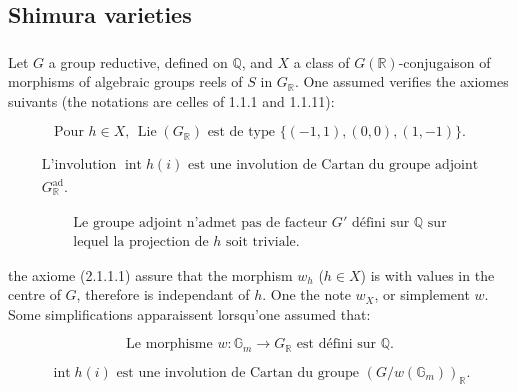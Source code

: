\documentclass[12pt,a4paper]{article}
\theoremstyle{plain}
\theoremstyle{definition}
\theoremstyle{remark}
\DeclareMathOperator{\Lie}{Lie}
\DeclareMathOperator{\Int}{int}
\newcommand{\QQ}{\mathbb{Q}}
\newcommand{\RR}{\mathbb{R}}
\newcommand{\Gm}{\mathbb{G}}
\begin{document}
\subsection{Shimura varieties}

\subsubsection{}

Let $G$ a group reductive, defined on $\QQ$, and $X$ a class of $G(\RR)$-conjugaison of morphisms of algebraic groups reels of $S$ in $G_{\RR}$. One assumed verifies the axiomes suivants (the notations are celles of 1.1.1 and 1.1.11):

\begin{equation}\label{eq:2.1.1.1}
\text{Pour } h \in X \text{, } \Lie(G_{\RR}) \text{ est de type } \{(-1,1),(0,0),(1,-1)\}.
\end{equation}

\begin{equation}\label{eq:2.1.1.2}
\begin{array}{l}
\text{L'involution } \Int h(i) \text{ est une involution de Cartan du groupe adjoint}\\
G^{\text{ad}}_{\RR}.
\end{array}
\end{equation}

\begin{equation}\label{eq:2.1.1.3}
\begin{array}{l}
\text{Le groupe adjoint n'admet pas de facteur } G' \text{ d\'efini sur } \QQ \text{ sur}\\
\text{lequel la projection de } h \text{ soit triviale.}
\end{array}
\end{equation}

the axiome (2.1.1.1) assure that the morphism $w_h$ ($h \in X$) is with values in the centre of $G$, therefore is independant of $h$. One the note $w_X$, or simplement $w$. Some simplifications apparaissent lorsqu'one assumed that:

\begin{equation}\label{eq:2.1.1.4}
\text{Le morphisme } w:\Gm_m \to G_{\RR} \text{ est d\'efini sur } \QQ.
\end{equation}

\begin{equation}\label{eq:2.1.1.5}
\Int h(i) \text{ est une involution de Cartan du groupe } (G/w(\Gm_m))_{\RR}.
\end{equation}
\end{document}
